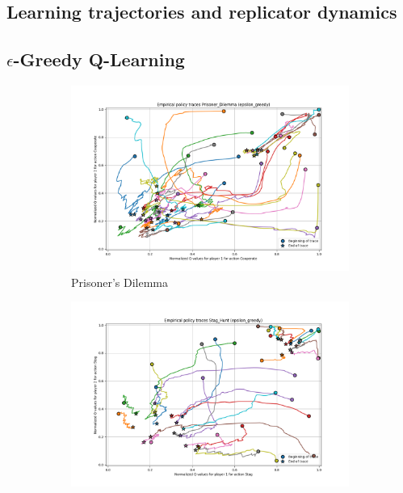 \documentclass[12pt,a4paper, onecolumn]{exam}
\begin{document}
\begin{appendices}
    \section{Learning trajectories and replicator dynamics}

    \subsection{$\epsilon$-Greedy Q-Learning}

    \begin{figure}[H]
        \centering
        \begin{subfigure}{0.44\textwidth}
            \centering
            \includegraphics[width=\linewidth]{plots/replicator_trajectoreis_Prisoner_Dilemma_epsilon_greedy.png}
            \caption{Prisoner's Dilemma}
        \end{subfigure}
        \hfill
        \begin{subfigure}{0.44\textwidth}
            \centering
            \includegraphics[width=\linewidth]{plots/replicator_trajectoreis_Stag_Hunt_epsilon_greedy.png}

\end{subfigure}
\end{figure}
\end{appendices}
\end{document}
